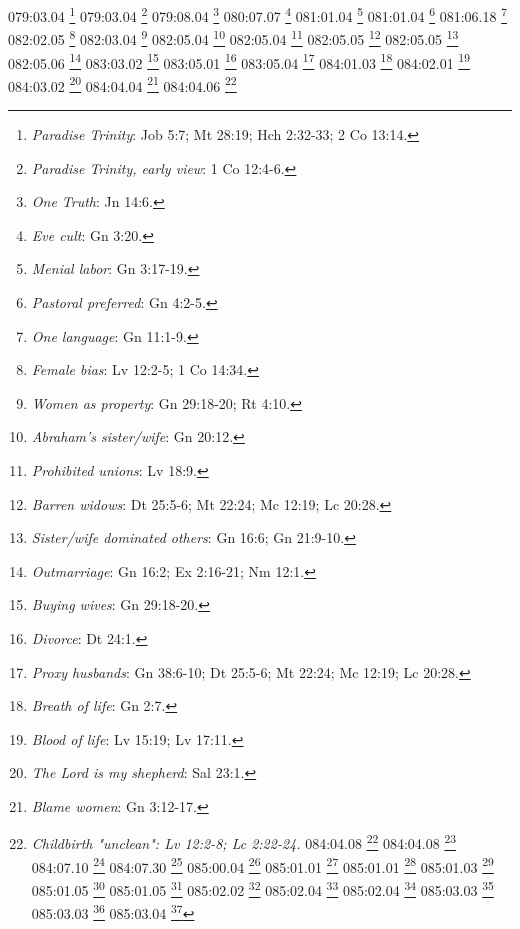 {{{{{{{{{{{{{{{{{{{{{079:03.04 \footnote{\textit{Paradise Trinity}: Job 5:7; Mt 28:19; Hch 2:32-33; 2 Co 13:14.}
079:03.04 \footnote{\textit{Paradise Trinity, early view}: 1 Co 12:4-6.}
079:08.04 \footnote{\textit{One Truth}: Jn 14:6.}
080:07.07 \footnote{\textit{Eve cult}: Gn 3:20.}
081:01.04 \footnote{\textit{Menial labor}: Gn 3:17-19.}
081:01.04 \footnote{\textit{Pastoral preferred}: Gn 4:2-5.}
081:06.18 \footnote{\textit{One language}: Gn 11:1-9.}
082:02.05 \footnote{\textit{Female bias}: Lv 12:2-5; 1 Co 14:34.}
082:03.04 \footnote{\textit{Women as property}: Gn 29:18-20; Rt 4:10.}
082:05.04 \footnote{\textit{Abraham's sister/wife}: Gn 20:12.}
082:05.04 \footnote{\textit{Prohibited unions}: Lv 18:9.}
082:05.05 \footnote{\textit{Barren widows}: Dt 25:5-6; Mt 22:24; Mc 12:19; Lc 20:28.}
082:05.05 \footnote{\textit{Sister/wife dominated others}: Gn 16:6; Gn 21:9-10.}
082:05.06 \footnote{\textit{Outmarriage}: Gn 16:2; Ex 2:16-21; Nm 12:1.}
083:03.02 \footnote{\textit{Buying wives}: Gn 29:18-20.}
083:05.01 \footnote{\textit{Divorce}: Dt 24:1.}
083:05.04 \footnote{\textit{Proxy husbands}: Gn 38:6-10; Dt 25:5-6; Mt 22:24; Mc 12:19; Lc 20:28.}
084:01.03 \footnote{\textit{Breath of life}: Gn 2:7.}
084:02.01 \footnote{\textit{Blood of life}: Lv 15:19; Lv 17:11.}
084:03.02 \footnote{\textit{The Lord is my shepherd}: Sal 23:1.}
084:04.04 \footnote{\textit{Blame women}: Gn 3:12-17.}
084:04.06 \footnote{\textit{Childbirth "unclean": Lv 12:2-8; Lc 2:22-24.}
084:04.08 \footnote{\textit{Defiled by touching}: Lv 15:21-22.}
084:04.08 \footnote{\textit{Quarantine}: Lv 15:19-20.}
084:07.10 \footnote{\textit{Love of grandkids}: Pr 17:6.}
084:07.30 \footnote{\textit{Child rearing}: Pr 22:6.}
085:00.04 \footnote{\textit{Worship God's works}: Sab 13:2.}
085:01.01 \footnote{\textit{Jacob's stone}: Gn 28:18.}
085:01.01 \footnote{\textit{Rachel's stones}: Gn 31:19,30-35.}
085:01.03 \footnote{\textit{Stone as witness}: Jos 24:27.}
085:01.05 \footnote{\textit{High places}: 1 Re 3:2-3; 2 Re 18:4,34; Lv 26:30; Nm 21:28; Nm 22:41; Dt 33:29.}
085:01.05 \footnote{\textit{Holy mountains}: Ex 3:1,12; Ex 19:3,11-23; Ex 24:12-18; Sal 74:2; Sal 121:1; Is 2:2; Jer 3:23; Nm 10:33; Dt 11:29; Jn 4:20-21.}
085:02.02 \footnote{\textit{Spiritual lessons}: 1 Co 15:35-38; 2 Co 9:10.}
085:02.04 \footnote{\textit{Holy groves}: Gn 21:33; 2 Re 17:9-11,16; 2 Cr 33:19; Dt 16:21.}
085:02.04 \footnote{\textit{Tree of life}: Gn 2:9; Gn 3:22; Ap 2:7; Ap 22:2,14.}
085:03.03 \footnote{\textit{Serpent worship (Da 14:23)}: Bel 1:23.}
085:03.03 \footnote{\textit{Serpent worship}: Ex 4:2-4; Ex 7:9-12; 2 Re 18:4; Nm 21:8-9; Jn 3:14.}
085:03.04 \footnote{\textit{Dove of peace}: Gn 8:8-12; Lv 1:14; Mt 3:16; Mt 10:16; Mc 1:10; Lc 3:22; Jn 1:32.}
}}}}}}}}}}}}}}}}}}}}}}
